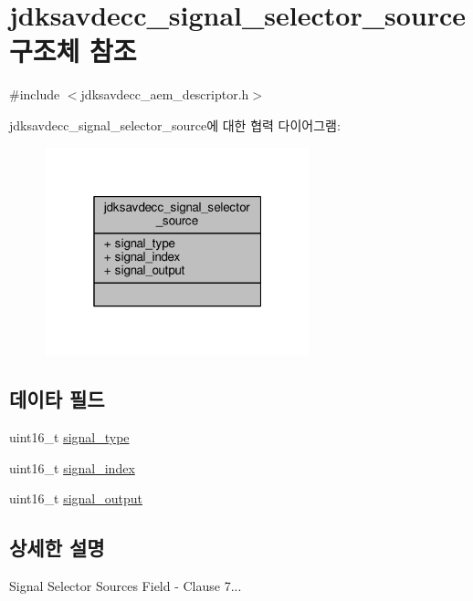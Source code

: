 \hypertarget{structjdksavdecc__signal__selector__source}{}\section{jdksavdecc\+\_\+signal\+\_\+selector\+\_\+source 구조체 참조}
\label{structjdksavdecc__signal__selector__source}


{\ttfamily \#include $<$jdksavdecc\+\_\+aem\+\_\+descriptor.\+h$>$}



jdksavdecc\+\_\+signal\+\_\+selector\+\_\+source에 대한 협력 다이어그램\+:
\nopagebreak
\begin{figure}[H]
\begin{center}
\leavevmode
\includegraphics[width=217pt]{structjdksavdecc__signal__selector__source__coll__graph}
\end{center}
\end{figure}
\subsection*{데이타 필드}
\begin{DoxyCompactItemize}
\item 
uint16\+\_\+t \hyperlink{structjdksavdecc__signal__selector__source_a248e60ef99d5ed1779989d1dd6b6dc5a}{signal\+\_\+type}
\item 
uint16\+\_\+t \hyperlink{structjdksavdecc__signal__selector__source_ae2e81a95ee9ad83f1fe22b6a1ee29075}{signal\+\_\+index}
\item 
uint16\+\_\+t \hyperlink{structjdksavdecc__signal__selector__source_ab4b91864e6fc335d7e86536d9f4461e4}{signal\+\_\+output}
\end{DoxyCompactItemize}


\subsection{상세한 설명}
Signal Selector Sources Field -\/ Clause 7... 

